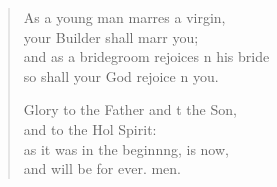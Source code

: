 \begin{verse}
\begin{patverse}
As a young man marr\pointup{\i}es a virgin,\Med\\
your Builder shall marr you;\\
and as a bridegroom rejoices \pointup{\i}n his bride\Med\\
so shall your God rejoice \pointup{\i}n you.

Glory to the Father and t the Son,\Med\\
    and to the Hol Spirit:\\
as it was in the beginn\pointup{\i}ng, is now,\Med\\
    and will be for ever. men.
  \end{patverse}
\end{verse}
